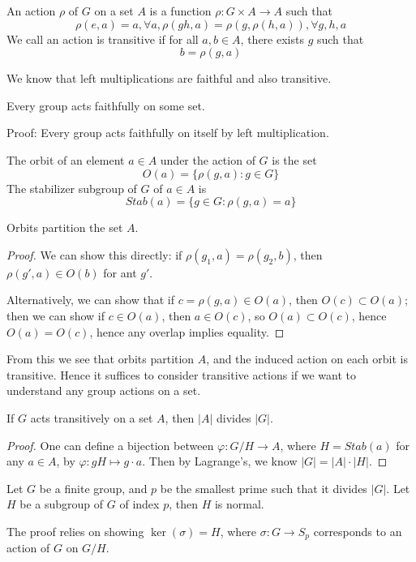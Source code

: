 \begin{defn}
    An action $\rho$ of $G$ on a set $A$ is a function $\rho: G\times A\to A$ such that 
    \begin{equation*}
        \rho(e,a)=a, \forall a, \rho(gh,a)=\rho(g, \rho(h,a)), \forall g,h, a
    \end{equation*}
    We call an action is transitive if for all $a,b\in A$, there exists $g$ such that
    \begin{equation*}
        b=\rho(g,a)
    \end{equation*}
\end{defn}
We know that left multiplications are faithful and also transitive.
\begin{thm}
    Every group acts faithfully on some set. 

    Proof: Every group acts faithfully on itself by left multiplication.
\end{thm}
\begin{defn}
    The orbit of an element $a\in A$ under the action of $G$ is the set
    \begin{equation*}
        O(a)=\{\rho(g,a): g\in G\}
    \end{equation*}
    The stabilizer subgroup of $G$ of $a\in A$ is
    \begin{equation*}
        Stab(a)=\{g\in G: \rho(g,a)=a\}
    \end{equation*}
\end{defn}
\begin{prop}
    Orbits partition the set $A$.
\end{prop}
\begin{proof}
    We can show this directly: if $\rho(g_1,a)=\rho(g_2, b)$, then $\rho(g',a)\in O(b)$ for ant $g'$.

    Alternatively, we can show that if $c=\rho(g,a)\in O(a)$, then $O(c)\subset O(a)$; then we can show if $c\in O(a)$, then $a\in O(c)$, so $O(a)\subset O(c)$, hence $O(a)=O(c)$, hence any overlap implies equality.
\end{proof}
From this we see that orbits partition $A$, and the induced action on each orbit is transitive. Hence it suffices to consider transitive actions if we want to understand any group actions on a set.

\begin{prop}
    If $G$ acts transitively on a set $A$, then $|A|$ divides $|G|$.
\end{prop}
\begin{proof}
    One can define a bijection between $\varphi: G/H\to A$, where $H=Stab(a)$ for any $a\in A$, by $\varphi: gH\mapsto g\cdot a$. Then by Lagrange's, we know $|G|=|A|\cdot|H|$.
\end{proof}
\begin{example}[9.11]
    Let $G$ be a finite group, and $p$ be the smallest prime such that it divides $|G|$. Let $H$ be a subgroup of $G$ of index $p$, then $H$ is normal.

    The proof relies on showing $\ker(\sigma)=H$, where $\sigma: G\to S_p$ corresponds to an action of $G$ on $G/H$. 
\end{example}


